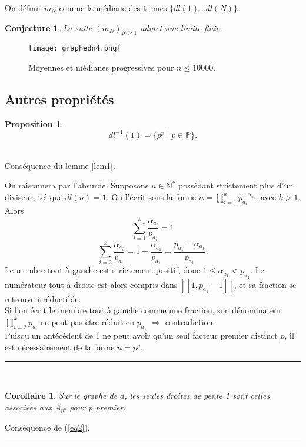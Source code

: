 \documentclass[a4paper, 12pt]{article}
\newcommand{\N}{\mathbb{N}}
\newcommand{\Pm}{\mathbb{P}}
\newcommand{\Prv}{\noindent{\it Preuve. }}
\newcommand{\cqfd}{\rule{0.2cm}{0.2cm}}
\newtheorem{prop}{Proposition}
\newtheorem{cor}{Corollaire}
\newtheorem*{conj}{Conjecture}
\begin{document}
On définit $m_N$ comme la médiane des termes $\{dl(1) \dots dl(N)\}$.
\begin{conj} La suite $(m_N)_{N \ge 1}$ admet une limite finie. \end{conj}


\begin{figure}[ht]
\begin{center}
\texttt{[image: graphedn4.png]}
\end{center}
\caption{\footnotesize{ Moyennes et médianes progressives pour $n \le 10000$.}}
\label{nuagen 4}
\end{figure}



\subsection{Autres propriétés}
\begin{prop} \label{prop11}
\begin{equation} \label{eq11} dl^{-1}(1) = \{p^p \mid p \in \Pm \}. \end{equation}
\end{prop}

\Prv \\

\fbox{$\supset$ :}
Conséquence du lemme \ref{lem1}.

\fbox{$\subset$ :}
On raisonnera par l'absurde. Supposons $n \in \N^{*}$ possédant strictement plus d'un diviseur, tel que $dl(n)=1$. On l'écrit sous la forme $n=\prod_{i=1}^{k} {p_{a_i}}^{\alpha_{a_i}}$, avec $k>1$. Alors
\[ \sum_{i=1}^{k} \frac{\alpha_{a_i}}{p_{a_i}} = 1 \]
\[ \sum_{i=2}^{k} \frac{\alpha_{a_i}}{p_{a_i}} = 1 - \frac{\alpha_{a_1}}{p_{a_1}} = \frac{p_{a_1}-\alpha_{a_1}}{p_{a_1}}. \]
Le membre tout à gauche est strictement positif, donc $1 \le \alpha_{a_1} < p_{a_1}$. Le numérateur tout à droite est alors compris dans $[\![1, p_{a_1}-1]\!]$, et sa fraction se retrouve irréductible.\\
Si l'on écrit le membre tout à gauche comme une fraction, son dénominateur $\prod_{i=2}^{k} p_{a_i}$ ne peut pas être réduit en $p_{a_1}$ $\Rightarrow$ contradiction.\\
Puisqu'un antécédent de 1 ne peut avoir qu'un seul facteur premier distinct $p$, il est nécessairement de la forme $n=p^p$. \cqfd \\

\begin{cor} \label{cor4} Sur le graphe de $d$, les seules droites de pente 1 sont celles associées aux $A_{p^p}$ pour p premier. \end{cor}
\Prv Conséquence de (\ref{eq2}). \cqfd \\
\end{document}
